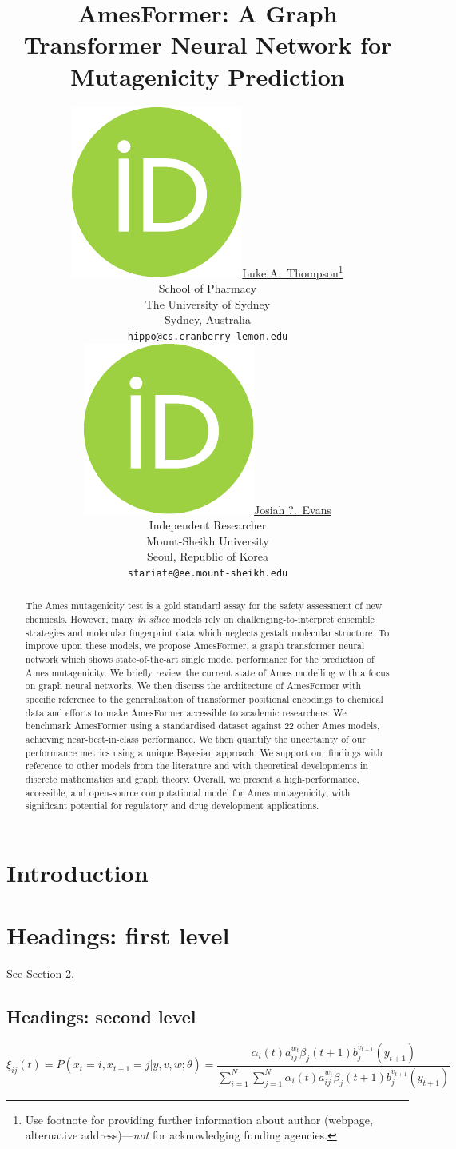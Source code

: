 \documentclass{article}
\title{AmesFormer: A Graph Transformer Neural Network for Mutagenicity Prediction}
\author{ \href{https://orcid.org/0000-0000-0000-0000}{\includegraphics[scale=0.06]{orcid.pdf}\hspace{1mm}Luke A.~Thompson}\thanks{Use footnote for providing further
		information about author (webpage, alternative
		address)---\emph{not} for acknowledging funding agencies.} \\
	School of Pharmacy\\
	The University of Sydney\\
	Sydney, Australia \\
	\texttt{hippo@cs.cranberry-lemon.edu} \\
	\And
	\href{https://orcid.org/0000-0000-0000-0000}{\includegraphics[scale=0.06]{orcid.pdf}\hspace{1mm}Josiah ?.~Evans} \\
	Independent Researcher\\
	Mount-Sheikh University\\
	Seoul, Republic of Korea \\
	\texttt{stariate@ee.mount-sheikh.edu} \\
}
\begin{document}
\maketitle

\begin{abstract}
	The Ames mutagenicity test is a gold standard assay for the safety assessment of new chemicals. However, many \textit{in silico} models rely on challenging-to-interpret ensemble strategies and molecular fingerprint data which neglects gestalt molecular structure. To improve upon these models, we propose AmesFormer, a graph transformer neural network which shows state-of-the-art single model performance for the prediction of Ames mutagenicity. We briefly review the current state of Ames modelling with a focus on graph neural networks. We then discuss the architecture of AmesFormer with specific reference to the generalisation of transformer positional encodings to chemical data and efforts to make AmesFormer accessible to academic researchers. We benchmark AmesFormer using a standardised dataset against 22 other Ames models, achieving near-best-in-class performance. We then quantify the uncertainty of our performance metrics using a unique Bayesian approach. We support our findings with reference to other models from the literature and with theoretical developments in discrete mathematics and graph theory. Overall, we present a high-performance, accessible, and open-source computational model for Ames mutagenicity, with significant potential for regulatory and drug development applications. 
\end{abstract}




\section{Introduction}



\section{Headings: first level}
\label{sec:headings}

\lipsum[4] See Section \ref{sec:headings}.

\subsection{Headings: second level}
\lipsum[5]
\begin{equation}
	\xi _{ij}(t)=P(x_{t}=i,x_{t+1}=j|y,v,w;\theta)= {\frac {\alpha _{i}(t)a^{w_t}_{ij}\beta _{j}(t+1)b^{v_{t+1}}_{j}(y_{t+1})}{\sum _{i=1}^{N} \sum _{j=1}^{N} \alpha _{i}(t)a^{w_t}_{ij}\beta _{j}(t+1)b^{v_{t+1}}_{j}(y_{t+1})}}
\end{equation}
\end{document}
